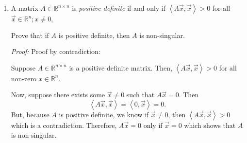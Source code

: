\documentclass[a4paper,12pt]{article}
\newcommand{\reals}{\mathbb{R}}
\newcommand{\inner}[1]{\left\langle #1 \right\rangle}
\newenvironment{proof}[2][$\square$]
    {\setlength{\parskip}{0pt}\par\textit{Proof:} #2\setlength{\parskip}{0.25cm}
        \savebox{\qed}{#1}
        \begin{adjustwidth}{\widthof{Proof:}}{}
    }
    {
        \hfill\usebox{\qed}\end{adjustwidth}
    }
\begin{document}
\begin{enumerate}[label = \arabic*.]
	\begin{proof}{}
		Suppose we have similar square $ n \times n $ matrices $ A $ and $ B $. Then, by the definition of similar matrices, there exists an invertible $ n \times n $ matrix $ P $ such that
		\begin{equation}
			A = P^{-1} B P. \label{equ:sim}
		\end{equation}
		Now, suppose $ A $ has an eigenvalue $ \lambda $ with corresponding eigenvector $ \vec{\lambda} $. Then, $ A \vec{\lambda} = \lambda \vec{\lambda} $. Furthermore,
		\[
			P^{-1} B P \vec{\lambda} = A \vec{\lambda} = \lambda \vec{\lambda}.
		\]
		Rearranging yields
		\begin{equation}
			B (P \vec{\lambda}) = \lambda (P \vec{\lambda}) \label{equ:eig}
		\end{equation}
		which implies $ P \vec{\lambda} $ is an eigenvector of $ B $ with corresponding eigenvalue $ \lambda $. Thus, $ A $ and $ B $ both have the same eigenvalue and because we picked any eigenvalue of $ A $ and $ A $ and $ B $ are the same size, $ A $ and $ B $ must have the same eigenvalues. Furthermore, from \eqref{equ:eig}, we can form a one-to-one correspondence between the eigenvectors $ \vec{\lambda}_A $ of $ A $ to the eigenvectors $ \vec{\lambda}_B $ of $ B $ as
		\[
			\vec{\lambda}_B = P \vec{\lambda}_A
		\]
		because $ P $ is invertible and thus one-to-one in mapping eigenvectors of $ A $ to of eigenvectors $ B $.
	\end{proof}

    \item A matrix $ A \in \reals^{n \times n} $ is \emph{positive definite} if and only if $ \inner{A \vec{x}, \vec{x}} > 0 $ for all $ \vec{x} \in \reals^n; x \neq 0 $,
    
    Prove that if $ A $ is positive definite, then $ A $ is non-singular.
    
    \begin{proof}{Proof by contradiction:}
        Suppose $ A \in \reals^{n \times n} $ is a positive definite matrix. Then, $ \inner{A \vec{x}, \vec{x}} > 0 $ for all non-zero $ x \in \reals^n $. 
        
        Now, suppose there exists some $ \vec{x} \neq 0 $ such that $ A\vec{x} = 0 $. Then
        \[
            \inner{A\vec{x}, \vec{x}} = \inner{0, \vec{x}} = 0.
        \]
        But, because $ A $ is positive definite, we know if $ \vec{x} \neq 0 $, then $ \inner{A\vec{x}, \vec{x}} > 0$ which is a contradiction. Therefore, $ A\vec{x} = 0 $ only if $ \vec{x} = 0 $ which shows that $ A $ is non-singular.
    \end{proof}


\end{enumerate}
\end{document}
